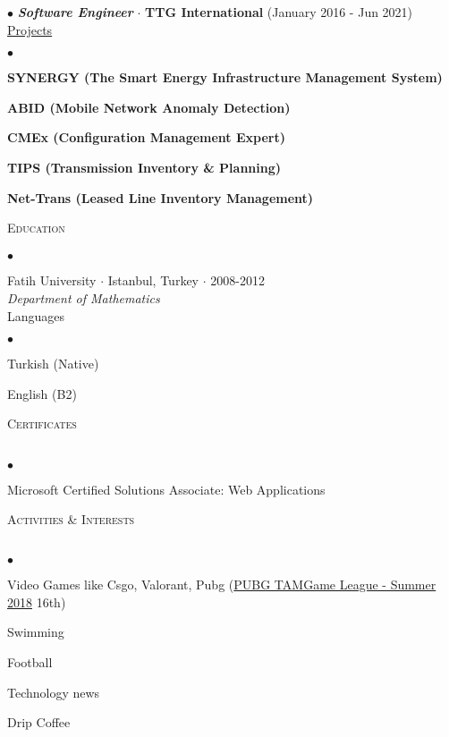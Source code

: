 \documentclass[11pt]{article}
\newcommand{\Csharp}{%
  {\settoheight{\dimen0}{C}C\kern-.05em \resizebox{!}{\dimen0}{\raisebox{\depth}{\#}}}}
\newcommand{\lineunder}{\vspace*{-8pt} \\ \hspace*{-18pt} \hrulefill \\}
\newcommand{\header}[1]{{\hspace*{-15pt}\vspace*{6pt} \textsc{#1}} \vspace*{-6pt} \lineunder}
\newcommand{\employer}[3]{{ \textbf{\emph{#1}} $\cdot$ \textbf{#2} (#3)\\ \vspace{1mm}  }}
\newenvironment{achievements}
{
  \begin{list}{$\bullet$}{\topsep 0pt \itemsep -2pt}}{\vspace*{4pt}\end{list}
}
\newenvironment{projects}
{
  \underline{Projects} \vspace{1mm} \begin{list}{$\bullet$}{\topsep 0pt \itemsep -2pt}}{\vspace*{4pt}\end{list}  \vspace{2mm}
}
\newcommand{\school}[5]
{
  #1
  $\cdot$ #2 
  $\cdot$ #3 \\
  \hspace*{28pt}\emph{#4}\\
  \vspace*{5pt}
}
\newcommand{\projectSummaries}[1]
{
  \vspace{1mm}  \textbf{#1}\\ \vspace{1mm}
}
\begin{document}
\hspace*{-12pt}$\bullet$
\employer{Software Engineer}{TTG International}{January 2016 - Jun 2021}
    
      
 \keyword{\Csharp}    
\begin{projects}
  \item \projectSummaries{SYNERGY (The Smart Energy Infrastructure Management System)}
  \item \projectSummaries{ABID (Mobile Network Anomaly Detection)}
  \item \projectSummaries{CMEx (Configuration Management Expert)}
  \item \projectSummaries{TIPS (Transmission Inventory \& Planning)}
  \item \projectSummaries{Net-Trans (Leased Line Inventory Management)}
\end{projects}


\header{ Education}
\vspace{1mm}
\hspace*{17pt}$\bullet$
\school{Fatih University}{Istanbul, Turkey}{2008-2012}{Department of Mathematics}


\header{ Languages}
\begin{achievements}
  \item Turkish (Native)
  \item English (B2)
\end{achievements}


\header{ Certificates}
\begin{achievements}
  \item Microsoft Certified Solutions Associate: Web Applications
\end{achievements}


\header{ Activities \& Interests}
\begin{achievements}
  \item Video Games like Csgo, Valorant, Pubg (\href{https://liquipedia.net/pubg/PUBG_TAMGame_League/2018/Summer}{PUBG TAMGame League - Summer 2018} 16th)
  \item Swimming
  \item Football
  \item Technology news
  \item Drip Coffee
\end{achievements}
\end{document}
